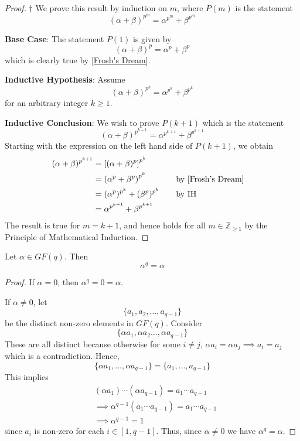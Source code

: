 \begin{proof} $ \dagger $
    We prove this result by induction on $ m $, where $ P(m) $ is the statement
    \[ (\alpha+\beta)^{p^m}=\alpha^{p^m}+\beta^{p^m} \]

    \textbf{Base Case}: The statement $ P(1) $ is given by
    \[ (\alpha+\beta)^{p}=\alpha^p+\beta^p \]
    which is clearly true by \ref{Frosh's Dream}.

    \textbf{Inductive Hypothesis}: Assume
    \[ (\alpha+\beta)^{p^k}=\alpha^{p^k}+\beta^{p^k} \]
    for an arbitrary integer $ k\geqslant 1 $.

    \textbf{Inductive Conclusion}: We wish to prove $ P(k+1) $
    which is the statement
    \[ (\alpha+\beta)^{p^{k+1}}=\alpha^{p^{k+1}}+\beta^{p^{k+1}} \]
    Starting with the expression on the left hand side of $ P(k+1) $,
    we obtain
    \[ \begin{aligned}
            (\alpha+\beta)^{p^{k+1}}
             & =\left[ (\alpha+\beta)^{p} \right]^{p^{k}}                                         \\
             & =\left( \alpha^p+\beta^p \right)^{p^k}     & \quad & \text{by \ref{Frosh's Dream}} \\
             & = (\alpha^p)^{p^k}+(\beta^p)^{p^k}         &       & \text{by IH}                  \\
             & =\alpha^{p^{k+1}}+\beta^{p^{k+1}}
        \end{aligned}
    \]
    The result is true for $ m=k+1 $, and hence holds for all $ m\in\mathbb{Z}_{\geqslant 1} $
    by the Principle of Mathematical Induction.
\end{proof}

\begin{thmbox}
    \begin{theorem}
        Let $ \alpha\in GF(q) $. Then
        \[ \alpha^q=\alpha \]
    \end{theorem}
\end{thmbox}

\begin{proof}
    If $ \alpha=0 $, then $ \alpha^q=0=\alpha $.

    If $ \alpha\neq 0 $, let
    \[ \{a_1,a_2,\ldots ,a_{q-1}\} \]
    be the distinct non-zero elements in $ GF(q) $. Consider
    \[ \{\alpha a_1,\alpha a_2\ldots,\alpha a_{q-1}\} \]
    These are all distinct because otherwise for some $ i\neq j $,
    $ \alpha a_i=\alpha a_j\implies a_i=a_j $ which is a contradiction.
    Hence,
    \[ \{\alpha a_1,\ldots ,\alpha a_{q-1}\}=\{a_1,\ldots ,a_{q-1}\} \]
    This implies
    \begin{align*}
         & (\alpha a_1)\cdots (\alpha a_{q-1})=a_1\cdots a_{q-1}      \\
         & \implies \alpha^{q-1}(a_1\cdots a_{q-1})=a_1\cdots a_{q-1} \\
         & \implies \alpha^{q-1}=1
    \end{align*}
    since $ a_i $ is non-zero for each $ i\in[1,q-1] $.
    Thus, since $ \alpha\neq 0 $ we have $ \alpha^q=\alpha $.
\end{proof}


